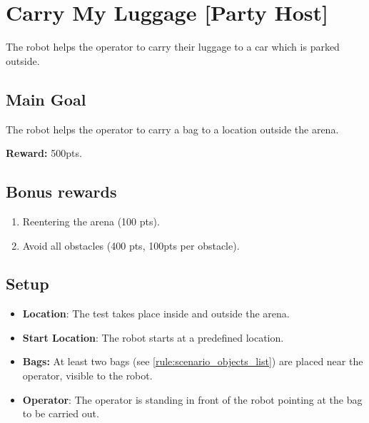 \section{Carry My Luggage [Party Host]}
\label{test:carry-my-luggage}
The robot helps the operator to carry their luggage to a car which is parked outside.


\subsection*{Main Goal}
The robot helps the operator to carry a bag to a location outside the arena.

\noindent\textbf{Reward:} 500pts.

\subsection*{Bonus rewards}
\begin{enumerate}[nosep]
	\item Reentering the arena (100 pts).
	\item Avoid all obstacles (400 pts, 100pts per obstacle).
\end{enumerate}


\subsection*{Setup}
\begin{itemize}[nosep]
	\item \textbf{Location}: The test takes place inside and outside the arena.

	\item \textbf{Start Location}: The robot starts at a predefined location.

	\item \textbf{Bags:} At least two bags (see \ref{rule:scenario_objects_list}) are placed near the operator, visible to the robot.

	\item \textbf{Operator}: The operator is standing in front of the robot pointing at the bag to be carried out.

\end{itemize}

